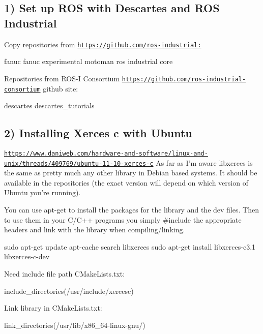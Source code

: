 \subsection*{1) Set up R\-O\-S with Descartes and R\-O\-S Industrial }

Copy repositories from \href{https://github.com/ros-industrial:}{\tt https\-://github.\-com/ros-\/industrial\-:} \begin{DoxyVerb}fanuc
fanuc experimental
motoman
ros industrial core
\end{DoxyVerb}


Repositories from R\-O\-S-\/\-I Consortium \href{https://github.com/ros-industrial-consortium}{\tt https\-://github.\-com/ros-\/industrial-\/consortium} github site\-: \begin{DoxyVerb}descartes
descartes_tutorials
\end{DoxyVerb}


\subsection*{2) Installing Xerces c with Ubuntu }

\href{https://www.daniweb.com/hardware-and-software/linux-and-unix/threads/409769/ubuntu-11-10-xerces-c}{\tt https\-://www.\-daniweb.\-com/hardware-\/and-\/software/linux-\/and-\/unix/threads/409769/ubuntu-\/11-\/10-\/xerces-\/c} As far as I'm aware libxerces is the same as pretty much any other library in Debian based systems. It should be available in the repositories (the exact version will depend on which version of Ubuntu you're running).

You can use apt-\/get to install the packages for the library and the dev files. Then to use them in your C/\-C++ programs you simply \#include the appropriate headers and link with the library when compiling/linking. \begin{DoxyVerb}sudo apt-get update
apt-cache search libxerces
sudo apt-get install libxerces-c3.1 libxerces-c-dev
\end{DoxyVerb}


Need include file path C\-Make\-Lists.\-txt\-: \begin{DoxyVerb}include_directories(/usr/include/xercesc)
\end{DoxyVerb}


Link library in C\-Make\-Lists.\-txt\-: \begin{DoxyVerb}link_directories(/usr/lib/x86_64-linux-gnu/)
\end{DoxyVerb}


